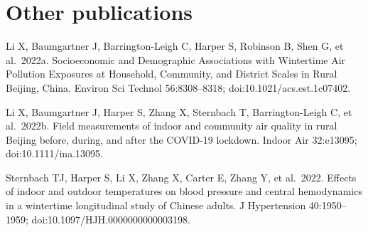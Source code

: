 \documentclass[
  letterpaper,
  DIV=11,
  numbers=noendperiod]{scrartcl}
\begin{document}
\hypertarget{other-publications}{%
\section*{Other publications}\label{other-publications}}

Li X, Baumgartner J, Barrington-Leigh C, Harper S, Robinson B, Shen G,
et al.~2022a. Socioeconomic and Demographic Associations with Wintertime
Air Pollution Exposures at Household, Community, and District Scales in
Rural Beijing, China. Environ Sci Technol 56:8308--8318;
doi:10.1021/acs.est.1c07402.

Li X, Baumgartner J, Harper S, Zhang X, Sternbach T, Barrington-Leigh C,
et al.~2022b. Field measurements of indoor and community air quality in
rural Beijing before, during, and after the COVID-19 lockdown. Indoor
Air 32:e13095; doi:10.1111/ina.13095.

Sternbach TJ, Harper S, Li X, Zhang X, Carter E, Zhang Y, et al.~2022.
Effects of indoor and outdoor temperatures on blood pressure and central
hemodynamics in a wintertime longitudinal study of Chinese adults. J
Hypertension 40:1950--1959; doi:10.1097/HJH.0000000000003198.
\end{document}
